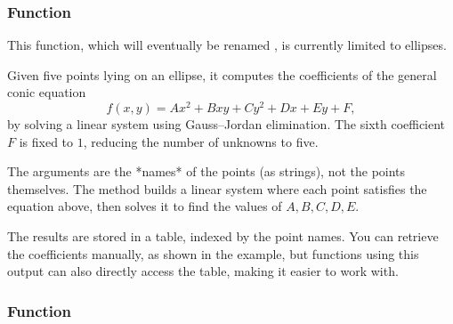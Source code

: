 \subsubsection{Function }
\label{ssub:search_ellipse}

This function, which will eventually be renamed , is currently limited to ellipses.

Given five points lying on an ellipse, it computes the coefficients of the general conic equation
\[
f(x, y) = Ax^2 + Bxy + Cy^2 + Dx + Ey + F,
\]
by solving a linear system using Gauss–Jordan elimination.
The sixth coefficient \( F \) is fixed to \( 1 \), reducing the number of unknowns to five.

The arguments are the *names* of the points (as strings), not the points themselves. The method builds a linear system where each point satisfies the equation above, then solves it to find the values of \( A, B, C, D, E \).

The results are stored in a table, indexed by the point names. You can retrieve the coefficients manually, as shown in the example, but functions using this output can also directly access the table, making it easier to work with.

\vspace{1em}

\begin{tkzexample}[latex=.35\textwidth]
\end{tkzexample}

\subsubsection{Function }
\label{ssub:function_ellipse_axes_angle}

